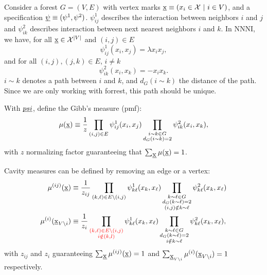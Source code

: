 \documentclass[12pt]{article}
\newcommand{\BS}{\backslash}
\newcommand{\XX}{{\mathcal{X}}}
\newcommand{\UBX}{\underbar{\textbf{\normalfont x}}}
\numberwithin{equation}{section}
\begin{document}
Consider a forest $G = (V, E)$ with vertex marks $\UBX\equiv (x_i\in\XX\ |\ i\in V)$, and a specification \(\underbar{$\psi$}\equiv(\psi^1, \psi^2)\). $\psi^1_{ij}$ describes the interaction between neighbors $i$ and $j$ and $\psi^2_{ik}$ describes interaction between next nearest neighbors $i$ and $k$. In NNNI, we have, for all $\UBX\in \XX^{|V|}$ and $(i, j)\in E$
\begin{equation}\label{Eq.NNNI-BP-Psi1}
    \psi^1_{ij}(x_i, x_j) = \lambda x_ix_j,
\end{equation}
and for all $(i, j), (j, k)\in E$, $i\neq k$
\begin{equation}\label{Eq.NNNI-BP-Psi2}
    \psi^2_{ik}(x_i, x_k) = - x_ix_k.
\end{equation}
$i\sim k$ denotes a path between $i$ and $k$, and $d_G(i\sim k)$ the distance of the path. Since we are only working with forrest, this path
should be unique.

With \(\underbar{$psi$}\), define the Gibb's measure (pmf):
\begin{equation}\label{Eq.NNNI-BP-Gibbs}
    \mu(\UBX) \equiv \frac{1}{z}\prod_{(i,j)\in E} \psi^1_{ij}(x_i, x_j)\prod_{\substack{i\sim k\in G\\d_G(i\sim k)=2}} \psi^2_{ik}(x_i, x_k),
\end{equation}
with $z$ normalizing factor guaranteeing that $\sum_{\UBX}\mu(\UBX) = 1$.

Cavity measures can be defined by removing an edge or a vertex:
\begin{align}
    \mu^{(ij)}(\UBX)         & \equiv \frac{1}{z_{ij}}\prod_{(k,\ell)\in E\BS (i,j)} \psi^1_{k\ell}(x_k, x_\ell)\prod_{\substack{k\sim \ell\in G \\d_G(k\sim \ell)=2\\(i,j)\notin k\sim \ell}} \psi^2_{k\ell}(x_k, x_\ell) \label{Eq.NNNI-BP-CE}\\
    \mu^{(i)}(\UBX_{V\BS i}) & \equiv \frac{1}{z_{i}}\prod_{ \textcolor{red}{\substack{(k,\ell)\in E\BS (i,j)                                                     \\i\notin (k, l)}}} \psi^1_{k\ell}(x_k, x_\ell)\prod_{\substack{k\sim \ell\in G\\d_G(k\sim \ell)=2\\i \notin k\sim \ell}} \psi^2_{k\ell}(x_k, x_\ell), \label{Eq.NNNI-BP-CV}
\end{align}
with $z_{ij}$ and $z_i$ guaranteeing $\sum_{\UBX}\mu^{(ij)}(\UBX) = 1$ and $\sum_{\UBX_{V\BS i}}\mu^{(i)}(\UBX_{V\BS i}) = 1$ respectively.
\end{document}
